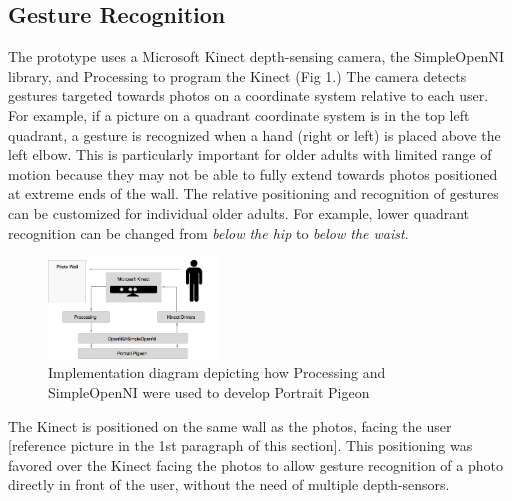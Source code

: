 \documentclass{chi-ext}
\begin{document}
\subsection{Gesture Recognition}
The prototype uses a Microsoft Kinect depth-sensing camera, the SimpleOpenNI library, and Processing to program the Kinect (Fig 1.) The camera detects gestures targeted towards photos on a coordinate system relative to each user. For example, if a picture on a quadrant coordinate system is in the top left quadrant, a gesture is recognized when a hand (right or left) is placed above the left elbow. This is particularly important for older adults with limited range of motion because they may not be able to fully extend towards photos positioned at extreme ends of the wall. The relative positioning and recognition of gestures can be customized for individual older adults. For example, lower quadrant recognition can be changed from \textit{below the hip} to \textit{below the waist}.


\begin{figure}
    \centering
    \includegraphics[width=0.4\textwidth]{portrait_pigeon_impl_diagram.png}
    \caption{Implementation diagram depicting how Processing and SimpleOpenNI were used to develop Portrait Pigeon}
\end{figure}

The Kinect is positioned on the same wall as the photos, facing the user [reference picture in the 1st paragraph of this section]. This positioning was favored over the Kinect facing the photos to allow gesture recognition of a photo directly in front of the user, without the need of multiple depth-sensors. 
\end{document}
